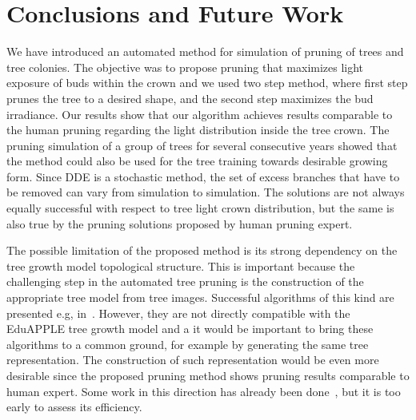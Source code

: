 \section{Conclusions and Future Work}
We have introduced an automated method for simulation of pruning of
trees and tree colonies. The objective was to propose pruning that
maximizes light exposure of buds within the crown and we used two step
method, where first step prunes the tree to a desired shape, and the
second step maximizes the bud irradiance. Our results show that our algorithm achieves results comparable
to the human pruning regarding the light
distribution inside the tree crown. The pruning simulation of a group of
trees for several consecutive years showed that the method could also be
used for the tree training towards desirable growing form. Since DDE is
a stochastic method, the set of excess branches that have to be removed
can vary from simulation to simulation. The solutions are not always
equally successful with respect to tree light crown distribution, but
the same is also true by the pruning solutions proposed by human pruning
expert.

The possible limitation of the proposed method is its strong dependency
on the tree growth model topological structure. This is important
because the challenging step in the automated tree pruning is the
construction of the appropriate tree model from tree images. Successful
algorithms of this kind are presented e.g, in~\cite{akbar_novel_2016,benes_visual_1997,de_reffye_plant_1988,palubicki_self-organizing_2009}.
However, they are not directly compatible with the EduAPPLE tree growth model and a
it would be important to bring these algorithms to a common ground, 
for example by generating the same tree representation. The construction of such representation would be even more desirable since the proposed pruning method shows pruning results comparable to human
expert. Some
work in this direction has already been done~\cite{kohek_estimation_2017}, 
but it is too early to assess its efficiency.

